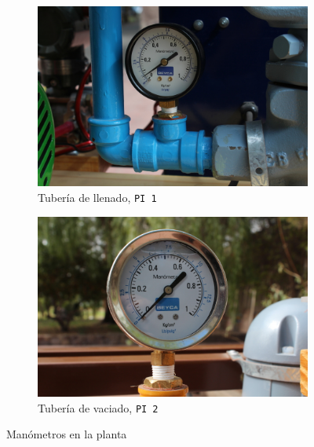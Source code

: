 \begin{figure}[t]
        \centering
        \begin{subfigure}[b]{0.48\textwidth}
\includegraphics[width=\textwidth]
	{Cap2-DisenoEnsamblado/images/manometro1.JPG}
	\caption{Tubería de llenado, \texttt{PI 1}}
        \end{subfigure}%
        \hfill
        \begin{subfigure}[b]{0.48\textwidth}
\includegraphics[width=\textwidth]
	{Cap2-DisenoEnsamblado/images/manometro2.JPG}
	\caption{Tubería de vaciado, \texttt{PI 2}}
        \end{subfigure}
        \caption{Manómetros en la planta}
        \label{fig:manometro}
\end{figure}

